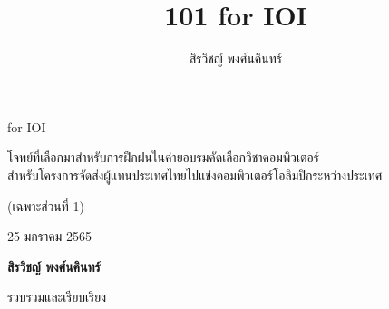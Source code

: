 \documentclass[12pt,a4paper]{report}
\title{101 for IOI}
\author{สิรวิชญ์ พงศ์นคินทร์}
\date{}
\begin{document}
\thispagestyle{titlepage}

\vspace*{\fill}

\begin{center}
{
    \noindent\sffamily
    {\Huge{} for IOI}
    
    \medskip
    
    โจทย์ที่เลือกมาสำหรับการฝึกฝนในค่ายอบรมคัดเลือกวิชาคอมพิวเตอร์\\
    สำหรับโครงการจัดส่งผู้แทนประเทศไทยไปแข่งคอมพิวเตอร์โอลิมปิกระหว่างประเทศ
    
    \bigskip
    
    (เฉพาะส่วนที่ 1)
    
    \vspace{2cm}
    
    25 มกราคม 2565
    
    \vspace{3cm}
    
    \textbf{สิรวิชญ์ พงศ์นคินทร์}
    
    รวบรวมและเรียบเรียง
}
\end{center}


\vspace*{\fill}

\newpage


\pagestyle{plain}
\fancyhead[R]{\sffamily {\leftmark}}












\end{document}
